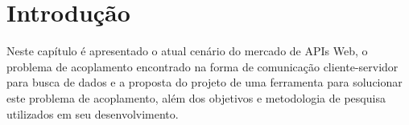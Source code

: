 \chapter{Introdução}

Neste capítulo é apresentado o atual cenário do mercado de APIs Web, o problema de acoplamento encontrado na forma de comunicação cliente-servidor para busca de dados e a proposta do projeto de uma ferramenta para solucionar este problema de acoplamento, além dos objetivos e metodologia de pesquisa utilizados em seu desenvolvimento.





